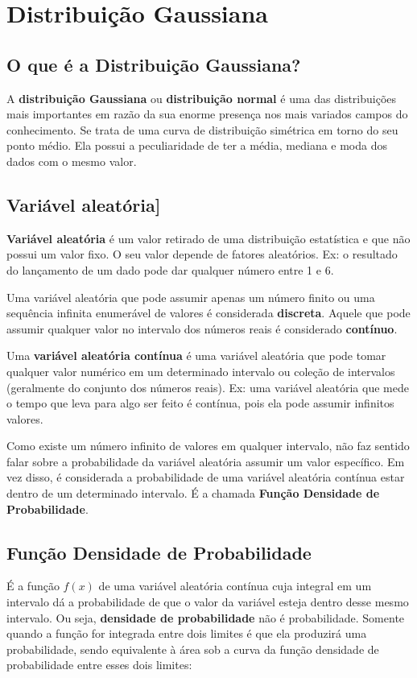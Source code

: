 \section{Distribuição Gaussiana}

\subsection{O que é a Distribuição Gaussiana?}
A \textbf{distribuição Gaussiana} ou \textbf{distribuição normal} é uma das distribuições mais importantes em razão da sua enorme presença nos mais variados campos do conhecimento. Se trata de uma curva de distribuição simétrica em torno do seu ponto médio. Ela possui a peculiaridade de ter a média, mediana e moda dos dados com o mesmo valor.

\subsection{Variável aleatória]}
\textbf{Variável aleatória} é um valor retirado de uma distribuição estatística e que não possui um valor fixo. O seu valor depende de fatores aleatórios. Ex: o resultado do lançamento de um dado pode dar qualquer número entre 1 e 6.

Uma variável aleatória que pode assumir apenas um número finito ou uma sequência infinita enumerável de valores é considerada \textbf{discreta}. Aquele que pode assumir qualquer valor no intervalo dos números reais é considerado \textbf{contínuo}. 

Uma \textbf{variável aleatória contínua} é uma variável aleatória que pode tomar qualquer valor numérico em um determinado intervalo ou coleção de intervalos (geralmente do conjunto dos números reais). Ex: uma variável aleatória que mede o tempo que leva para algo ser feito é contínua, pois ela pode assumir infinitos valores.

Como existe um número infinito de valores em qualquer intervalo, não faz sentido falar sobre a probabilidade da variável aleatória assumir um valor específico. Em vez disso, é considerada a probabilidade de uma variável aleatória contínua estar dentro de um determinado intervalo. É a chamada \textbf{Função Densidade de Probabilidade}.

\subsection{Função Densidade de Probabilidade}

É a função $f(x)$  de uma variável aleatória contínua cuja integral em um intervalo dá a probabilidade de que o valor da variável esteja dentro desse mesmo intervalo. Ou seja, \textbf{densidade de probabilidade} não é probabilidade. Somente quando a função for integrada entre dois limites é que ela produzirá uma probabilidade, sendo equivalente à área sob a curva da função densidade de probabilidade entre esses dois limites:

